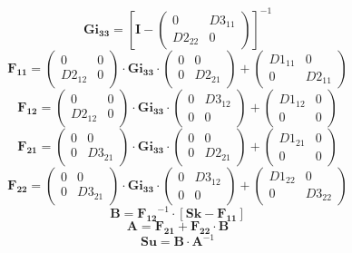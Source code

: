 \[ \mathbf{Gi_{33}} = \left[\mathbf{I} -\left(\begin{smallmatrix} 0 & D3_{11} \\ D2_{22} & 0 \end{smallmatrix}\right)\right]^{-1} \]
\[ \mathbf{F_{11}} = \left(\begin{smallmatrix} 0 & 0 \\ D2_{12} & 0 \end{smallmatrix}\right) \cdot\mathbf{Gi_{33}}\cdot \left(\begin{smallmatrix} 0 & 0 \\ 0 & D2_{21} \end{smallmatrix}\right) + \left(\begin{smallmatrix} D1_{11} & 0 \\ 0 & D2_{11} \end{smallmatrix}\right) \]
\[ \mathbf{F_{12}} = \left(\begin{smallmatrix} 0 & 0 \\ D2_{12} & 0 \end{smallmatrix}\right) \cdot\mathbf{Gi_{33}}\cdot \left(\begin{smallmatrix} 0 & D3_{12} \\ 0 & 0 \end{smallmatrix}\right) + \left(\begin{smallmatrix} D1_{12} & 0 \\ 0 & 0 \end{smallmatrix}\right) \]
\[ \mathbf{F_{21}} = \left(\begin{smallmatrix} 0 & 0 \\ 0 & D3_{21} \end{smallmatrix}\right) \cdot\mathbf{Gi_{33}}\cdot \left(\begin{smallmatrix} 0 & 0 \\ 0 & D2_{21} \end{smallmatrix}\right) + \left(\begin{smallmatrix} D1_{21} & 0 \\ 0 & 0 \end{smallmatrix}\right) \]
\[ \mathbf{F_{22}} = \left(\begin{smallmatrix} 0 & 0 \\ 0 & D3_{21} \end{smallmatrix}\right) \cdot\mathbf{Gi_{33}}\cdot \left(\begin{smallmatrix} 0 & D3_{12} \\ 0 & 0 \end{smallmatrix}\right) + \left(\begin{smallmatrix} D1_{22} & 0 \\ 0 & D3_{22} \end{smallmatrix}\right) \]
\[ \mathbf{B}=\mathbf{F_{12}}^{-1}\cdot\left[\mathbf{Sk}-\mathbf{F_{11}}\right] \]
\[ \mathbf{A}=\mathbf{F_{21}}+\mathbf{F_{22}}\cdot\mathbf{B} \]
\[ \mathbf{Su}=\mathbf{B}\cdot\mathbf{A}^{-1} \]
